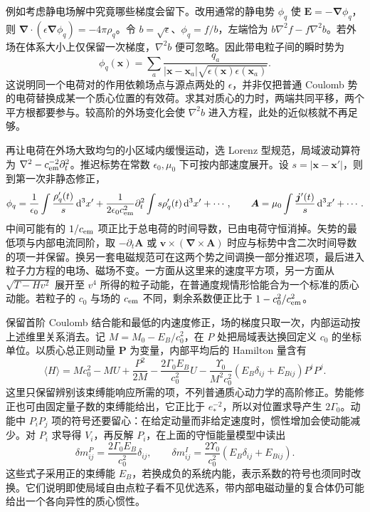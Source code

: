 例如考虑静电场解中究竟哪些梯度会留下。改用通常的静电势 $\phi_q$ 使 $\bm E=-\bm\nabla\phi_q$，则 $\bm\nabla\cdot(\epsilon\bm\nabla\phi_q)=-4\pi\rho_q$。令 $b=\sqrt\epsilon$、$\phi_q=f/b$，左端恰为 $b\nabla^2 f-f\nabla^2 b$。若外场在体系大小上仅保留一次梯度，$\nabla^2b$ 便可忽略。因此带电粒子间的瞬时势为
\[
 \phi_q(\bm x)=\sum_a
  \frac{q_a}{|\bm x-\bm x_a|\sqrt{\epsilon(\bm x)\epsilon(\bm x_a)}} .
\]
这说明同一个电荷对的作用依赖场点与源点两处的 $\epsilon$，并非仅把普通 Coulomb 势的电荷替换成某一个质心位置的有效荷。求其对质心的力时，两端共同平移，两个平方根都要参与。较高阶的外场变化会使 $\nabla^2 b$ 进入方程，此处的近似核就不再足够。

再让电荷在外场大致均匀的小区域内缓慢运动，选 Lorenz 型规范，局域波动算符为 $\nabla^2-c_{\rm em}^{-2}\partial_t^2$。推迟标势在常数 $\epsilon_0,\mu_0$ 下可按内部速度展开。设 $s=|\bm x-\bm x'|$，则到第一次非静态修正，
\[
 \phi_q=\frac1{\epsilon_0}\int\frac{\rho'_q(t)}s\,\dd^3x'
 +\frac1{2\epsilon_0 c_{\rm em}^2}\partial_t^2
        \int s\rho'_q(t)\,\dd^3x'+\cdots,\qquad
 \bm A=\mu_0\int\frac{\bm j'(t)}s\,\dd^3x'+\cdots .
\]
中间可能有的 $1/c_{\rm em}$ 项正比于总电荷的时间导数，已由电荷守恒消掉。矢势的最低项与内部电流同阶，取 $-\partial_t\bm A$ 或 $\bm v\times(\bm\nabla\times\bm A)$ 时应与标势中含二次时间导数的项一并保留。换另一套电磁规范可在这两个势之间调换一部分推迟项，最后进入粒子力方程的电场、磁场不变。一方面从这里来的速度平方项，另一方面从 $\sqrt{T-Hv^2}$ 展开至 $v^4$ 所得的粒子动能，在普通度规情形恰能合为一个标准的质心动能。若粒子的 $c_0$ 与场的 $c_{\rm em}$ 不同，剩余系数便正比于 $1-c_0^2/c_{\rm em}^2$。

保留首阶 Coulomb 结合能和最低的内速度修正，场的梯度只取一次，内部运动按上述维里关系消去。记 $M=M_0-E_B/c_0^2$，在 $P$ 处把局域表达换回定义 $c_0$ 的坐标单位。以质心总正则动量 $\bm P$ 为变量，内部平均后的 Hamilton 量含有
\[
 \langle H\rangle =
 Mc_0^2-MU+\frac{P^2}{2M}
 -\frac{2\Gamma_0 E_B}{c_0^2}U
 -\frac{\Upsilon_0}{M^2c_0^2}
       (E_B\delta_{ij}+E_{Bij})P^iP^j .
\]
这里只保留辨别该束缚能响应所需的项，不列普通质心动力学的高阶修正。势能修正也可由固定量子数的束缚能给出，它正比于 $e_*^{-2}$，所以对位置求导产生 $2\Gamma_0$。动能中 $P_iP_j$ 项的符号还要留心：在给定动量而非给定速度时，惯性增加会使动能减少。对 $P_i$ 求导得 $V_i$，再反解 $P_i$，在上面的守恒能量模型中读出
\[
 \delta m^P_{ij}=\frac{2\Gamma_0E_B}{c_0^2}\delta_{ij},\qquad
 \delta m^I_{ij}=\frac{2\Upsilon_0}{c_0^2}
                    (E_B\delta_{ij}+E_{Bij}).
\]
这些式子采用正的束缚能 $E_B$，若换成负的系统内能，表示系数的符号也须同时改换。它们说明即使局域自由点粒子看不见优选系，带内部电磁动量的复合体仍可能给出一个各向异性的质心惯性。

